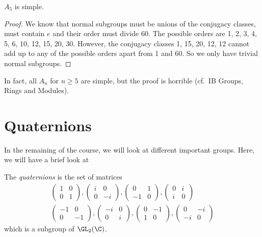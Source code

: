 \documentclass[a4paper]{article}
\begin{document}
\begin{thm}
  $A_5$ is simple.
\end{thm}

\begin{proof}
  We know that normal subgroups must be unions of the conjugacy classes, must contain $e$ and their order must divide 60. The possible orders are 1, 2, 3, 4, 5, 6, 10, 12, 15, 20, 30. However, the conjugacy classes 1, 15, 20, 12, 12 cannot add up to any of the possible orders apart from 1 and 60. So we only have trivial normal subgroups.
\end{proof}
In fact, all $A_n$ for $n\geq 5$ are simple, but the proof is horrible (cf.\ IB Groups, Rings and Modules).

\section{Quaternions}
In the remaining of the course, we will look at different important groups. Here, we will have a brief look at
\begin{defi}[Quaternions]
  The \emph{quaternions} is the set of matrices
  \begin{gather*}
    \begin{pmatrix}
      1&0\\0&1
    \end{pmatrix},
    \begin{pmatrix}
      i & 0\\0&-i
    \end{pmatrix},
    \begin{pmatrix}
      0&1\\-1&0
    \end{pmatrix},
    \begin{pmatrix}
      0&i\\i&0
    \end{pmatrix}
    \\
    \begin{pmatrix}
      -1&0\\0&-1
    \end{pmatrix},
    \begin{pmatrix}
      -i & 0\\0&i
    \end{pmatrix},
    \begin{pmatrix}
      0&-1\\1&0
    \end{pmatrix},
    \begin{pmatrix}
      0&-i\\-i&0
    \end{pmatrix}
  \end{gather*}
  which is a subgroup of $\GL_2(\C)$.
\end{defi}
\end{document}
